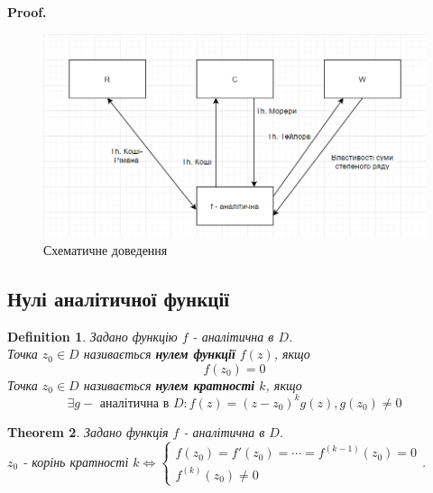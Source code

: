 \documentclass[a4paper, 10pt]{article}
\makeatletter
\def\qed{$\blacksquare$}
\theoremstyle{theoremdd}
\newtheorem{theorem}{Theorem}[subsection]
\theoremstyle{theoremdd}
\newtheorem{definition}[theorem]{Definition}
\theoremstyle{theoremdd}
\theoremstyle{theoremdd}
\theoremstyle{theoremdd}
\theoremstyle{theoremdd}
\theoremstyle{theoremdd}
\theoremstyle{theoremdd}
\renewenvironment{proof}[1][Proof.\\]{\par
\pushQED{\hfill \qed}%
\normalfont \topsep6\p@\@plus6\p@\relax
\trivlist
\item\relax
{\bfseries
#1\@addpunct{.}}\hspace\labelsep\ignorespaces
}{%
\popQED\endtrivlist\@endpefalse
}
\makeatother
\begin{document}
\begin{proof}
\begin{figure}[h]
	\includegraphics[scale = 0.7]{Pic.png}
	\caption*{Схематичне доведення}
\end{figure}
\end{proof}
	
\subsection{Нулі аналітичної функції}
\begin{definition}
Задано функцію $f$ - аналітична в $D$.\\
Точка $z_0 \in D$ називається \textbf{нулем функції} $f(z)$, якщо $$f(z_0) = 0$$
Точка $z_0 \in D$ називається \textbf{нулем кратності} $k$, якщо $$\exists g -  \text{ аналітична в } D: f(z)=(z-z_0)^k g(z), g(z_0) \neq 0$$
\end{definition}

\begin{theorem}
Задано функція $f$ - аналітична в $D$.\\
$z_0$ - корінь кратності $k \iff \begin{cases} f(z_0)=f'(z_0)=\cdots=f^{(k-1)}(z_0) = 0\\
f^{(k)}(z_0) \neq 0
\end{cases}$.
\end{theorem}
\end{document}
